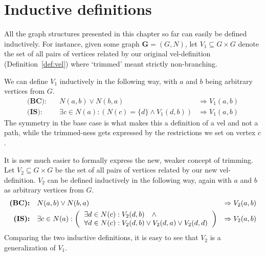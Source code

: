 


\section{Inductive definitions}
\label{sec:Inductive definitions}
All the graph structures presented in this chapter so far can easily be defined inductively.
For instance, given some graph $\mathbf{G}=(G,N)$, let $V_1 \subseteq G \times G$ denote the set of all pairs of vertices related by our original vel-definition (Definition~\ref{def:vel}) where `trimmed' meant strictly non-branching.

We can define $V_1$ inductively in the following way, with $a$ and $b$ being arbitrary vertices from $G$.
\begin{align}
  \textbf{(BC):}&\quad N(a,b) \vee N(b,a) &\Rightarrow  V_1(a,b)\\
  \textbf{(IS):}&\quad \exists c \in N(a): (N(c) =\{d\} \wedge V_1(d,b)) &\Rightarrow V_1(a,b)
\end{align}
The symmetry in the base case is what makes this a definition of a vel and not a path, while the trimmed-ness gets expressed by the restrictions we set on vertex $c$.

It is now  much easier to formally express the new, weaker concept of trimming.
Let $V_2 \subseteq G \times G$ be the set of all pairs of vertices related by our new vel-definition.
$V_2$ can be defined inductively in the following way, again with $a$ and $b$ as arbitrary vertices from $G$.
\begin{align}
  \textbf{(BC):}&\quad N(a,b) \vee N(b,a) &\Rightarrow V_2(a,b)\label{eq:V2_BC}\\
  \textbf{(IS):}&\quad \exists c \in N(a):
  \left ( \begin{tabular}{l}
  $\exists d \in N(c): V_2(d,b) \quad \wedge$\\
  $\forall d \in N(c): V_2(d,b) \vee V_2(d,a) \vee V_2(d,d)$
  \end{tabular} \right )
  &\Rightarrow V_2(a,b)\label{eq:V2_IS}
\end{align}
Comparing the two inductive definitions, it is easy to see that $V_2$ is a generalization of $V_1$.

